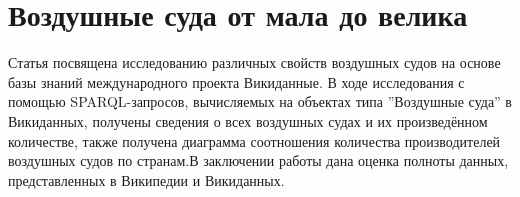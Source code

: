 \chapter{Воздушные суда от мала до велика}
\label{ch:aircraft-chapter}

Статья посвящена исследованию различных свойств воздушных судов на основе базы знаний международного проекта Викиданные. В ходе исследования с помощью SPARQL-запросов, вычисляемых на объектах типа ”Воздушные суда” в Викиданных, получены сведения о всех воздушных судах и их произведённом количестве, также получена диаграмма соотношения количества производителей воздушных судов по странам.В заключении работы дана оценка полноты данных, представленных в Википедии и Викиданных.
